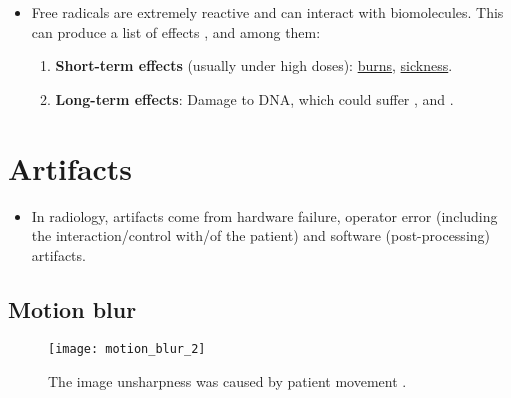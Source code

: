 \begin{itemize}
\item Free radicals are extremely reactive and can interact with
  biomolecules. This can produce a list of effects
  \cite{bushberg2011essential}, and among them:
  \begin{enumerate}
  \item \textbf{Short-term effects} (usually under high doses):
    \href{https://en.wikipedia.org/wiki/Radiation_burn}{burns},
    \href{https://en.wikipedia.org/wiki/Sickness}{sickness}.
  \item \textbf{Long-term effects}: Damage to DNA, which could suffer
    , and .
  \end{enumerate}
\end{itemize}

\section{Artifacts}
\begin{itemize}
\item In radiology, artifacts come from hardware failure, operator
  error (including the interaction/control with/of the patient) and
  software (post-processing) artifacts.
\end{itemize}

\newpage
\subsection*{Motion blur}
\vspace{-1ex}
\begin{figure}[H]
  \centering
  \texttt{[image: motion\_blur\_2]}
  \caption{The image unsharpness was caused by patient movement
    \cite{radiology_key}.\label{fig:motion_blur}}
\end{figure}

\newpage
